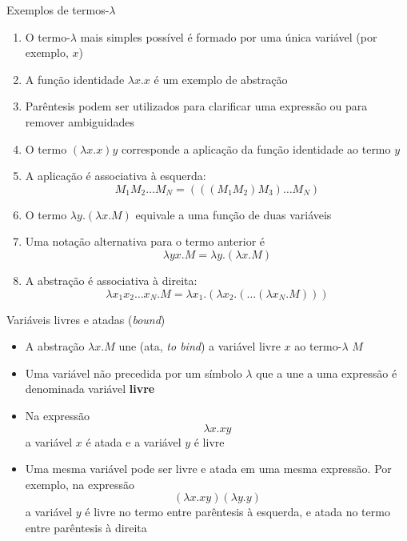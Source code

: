 \begin{frame}[fragile]{Exemplos de termos-$\lambda$}

    \begin{enumerate}
        \item O termo-$\lambda$ mais simples possível é formado por uma única variável (por 
            exemplo, $x$)

        \item A função identidade $\lambda x.x$ é um exemplo de abstração

        \item Parêntesis podem ser utilizados para clarificar uma expressão ou para remover
            ambiguidades

        \item O termo $(\lambda x.x)y$ corresponde a aplicação da função identidade ao termo $y$

        \item A aplicação é associativa à esquerda:
        \[
            M_1M_2\ldots M_N = (((M_1M_2)M_3)\ldots M_N)
        \]

        \item O termo $\lambda y.(\lambda x.M)$ equivale a uma função de duas variáveis

        \item Uma notação alternativa para o termo anterior é 
        \[
            \lambda yx.M = \lambda y.(\lambda x.M)
        \]

        \item A abstração é associativa à direita:
        \[
            \lambda x_1x_2\ldots x_N.M = \lambda x_1.(\lambda x_2.(\ldots (\lambda x_N.M)))
        \]
    \end{enumerate}

\end{frame}

\begin{frame}[fragile]{Variáveis livres e atadas ({\it bound})}

    \begin{itemize}
        \item A abstração $\lambda x.M$ une (ata, \textit{to bind}) a variável livre $x$ ao
            termo-$\lambda$ $M$

        \item Uma variável não precedida por um símbolo $\lambda$ que a une a uma expressão
            é denominada variável \textbf{livre}

        \item Na expressão 
        \[
            \lambda x.xy
        \]
        a variável $x$ é atada e a variável $y$ é livre

        \item Uma mesma variável pode ser livre e atada em uma mesma expressão. Por exemplo,
            na expressão
        \[
            (\lambda x.xy)(\lambda y.y)
        \]
        a variável $y$ é livre no termo entre parêntesis à esquerda, e atada no termo entre
        parêntesis à  direita

    \end{itemize}

\end{frame}

